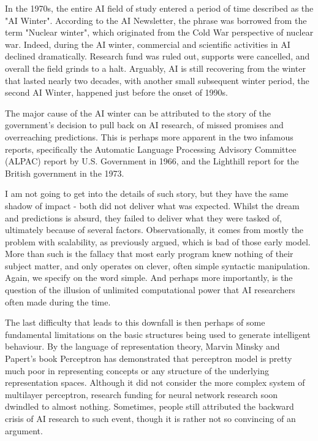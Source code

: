 In the 1970s, the entire AI field of study entered a period of time described as the "AI Winter". According to the AI Newsletter, the phrase was borrowed from the term "Nuclear winter", which originated from the Cold War perspective of nuclear war. Indeed, during the AI winter, commercial and scientific activities in AI declined dramatically. Research fund was ruled out, supports were cancelled, and overall the field grinds to a halt. Arguably, AI is still recovering from the winter that lasted nearly two decades, with another small subsequent winter period, the second AI Winter, happened just before the onset of 1990s. 

The major cause of the AI winter can be attributed to the story of the government's decision to pull back on AI research, of missed promises and overreaching predictions. This is perhaps more apparent in the two infamous reports, specifically the Automatic Language Processing Advisory Committee (ALPAC) report by U.S. Government in 1966, and the Lighthill report for the British government in the 1973. 

I am not going to get into the details of such story, but they have the same shadow of impact - both did not deliver what was expected. Whilst the dream and predictions is absurd, they failed to deliver what they were tasked of, ultimately because of several factors. Observationally, it comes from mostly the problem with scalability, as previously argued, which is bad of those early model. More than such is the fallacy that most early program knew nothing of their subject matter, and only operates on clever, often simple syntactic manipulation. Again, we specify on the word simple. And perhaps more importantly, is the question of the illusion of unlimited computational power that AI researchers often made during the time. 

The last difficulty that leads to this downfall is then perhaps of some fundamental limitations on the basic structures being used to generate intelligent behaviour. By the language of representation theory, Marvin Minsky and Papert's book Perceptron has demonstrated that perceptron model is pretty much poor in representing concepts or any structure of the underlying representation spaces. Although it did not consider the more complex system of multilayer perceptron, research funding for neural network research soon dwindled to almost nothing. Sometimes, people still attributed the backward crisis of AI research to such event, though it is rather not so convincing of an argument. 

